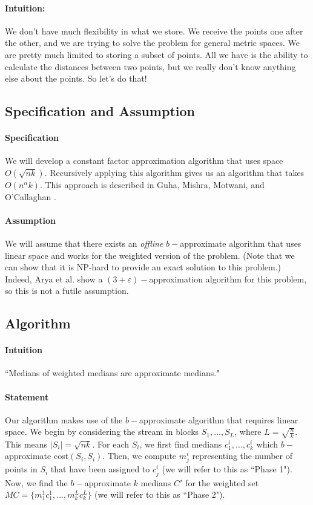 \documentclass[11pt]{article}
\begin{document}
\paragraph{Intuition:} We don't have much flexibility in what we store. We receive the points one after the other, and we are trying to solve the problem for general metric spaces. We are pretty much limited to storing a subset of points. All we have is the ability to calculate the distances between two points, but we really don't know anything else about the points. So let's do that!

\subsection{Specification and Assumption}
\paragraph{Specification} We will develop a constant factor approximation algorithm that uses space $O(\sqrt{nk})$. Recursively applying this algorithm gives us an algorithm that takes $O(n^\alpha k)$. This approach is described in Guha, Mishra, Motwani, and O'Callaghan \cite{GMMO_00}.
\paragraph{Assumption} We will assume that there exists an \textit{offline} $b-$approximate algorithm that uses linear space and works for the weighted version of the problem. (Note that we can show that it is NP-hard to provide an exact solution to this problem.) Indeed, Arya et al.\cite{AGKMMP_01} show a $(3+\varepsilon)-$approximation algorithm for this problem, so this is not a futile assumption.

\subsection{Algorithm}
\paragraph{Intuition} ``Medians of weighted medians are approximate medians."
\paragraph{Statement} Our algorithm makes use of the $b-$approximate algorithm that requires linear space. We begin by considering the stream in blocks $S_1, ..., S_L$, where $L = \sqrt{\frac{n}{k}}$. This means $|S_i| = \sqrt{nk}$. For each $S_i$, we first find medians $c_1^i, ..., c_k^i$ which $b-$approximate cost$(S_i, S_i)$. Then, we compute $m_j^i$ representing the number of points in $S_i$ that have been assigned to $c_j^i$ (we will refer to this as ``Phase 1"). Now, we find the $b-$approximate $k$ medians $C'$ for the weighted set $MC = \{m_1^1c_1^1, ..., m_k^Lc_k^L \} $ (we will refer to this as ``Phase 2").
\end{document}
